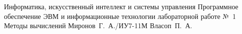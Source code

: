 \documentclass{bmstu}
\begin{document}
\makereporttitle
    {Информатика, искусственный интеллект и системы управления}
    {Программное обеспечение ЭВМ и информационные технологии}
    {лабораторной работе №~1}
    {Методы вычислений}
    {}
    {}
    {Миронов~Г.~А./ИУ7-11М}
    {Власоп~П.~А.}


\end{document}
